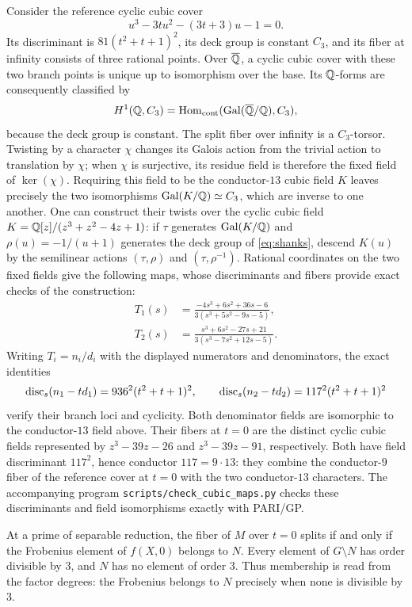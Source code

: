 Consider the reference cyclic cubic cover
\begin{equation}\label{eq:shanks}
 u^3-3tu^2-(3t+3)u-1=0.
\end{equation}
Its discriminant is $81(t^2+t+1)^2$, its deck group is constant $C_3$,
and its fiber at infinity consists of three rational points. Over
$\overline{\mathbb{Q}}$, a cyclic cubic cover with these two branch points is
unique up to isomorphism over the base. Its $\mathbb{Q}$-forms are consequently
classified by
\[
 H^1(\mathbb{Q},C_3)=\operatorname{Hom}_{\mathrm{cont}}
 (\operatorname{Gal}(\overline{\mathbb{Q}}/\mathbb{Q}),C_3),
\]
because the deck group is constant.  The split fiber over infinity is a
$C_3$-torsor.  Twisting by a character $\chi$ changes its Galois action
from the trivial action to translation by $\chi$; when $\chi$ is
surjective, its residue field is therefore the fixed field of
$\ker(\chi)$.  Requiring this field to be the conductor-$13$ cubic field
$K$ leaves precisely the two isomorphisms
$\operatorname{Gal}(K/\mathbb{Q})\simeq C_3$, which are inverse to one another.  One can
construct their twists over
the cyclic cubic field $K=\mathbb{Q}[z]/(z^3+z^2-4z+1)$: if $\tau$ generates
$\operatorname{Gal}(K/\mathbb{Q})$ and $\rho(u)=-1/(u+1)$ generates the deck group of
\eqref{eq:shanks}, descend $K(u)$ by the semilinear actions
$(\tau,\rho)$ and $(\tau,\rho^{-1})$. Rational coordinates on the two
fixed fields give the following maps, whose discriminants and fibers
provide exact checks of the construction:
\begin{align}
 T_1(s)&=\frac{-4s^3+6s^2+36s-6}{3(s^3+5s^2-9s-5)},\label{eq:T1}\\
 T_2(s)&=\frac{s^3+6s^2-27s+21}{3(s^3-7s^2+12s-5)}.\label{eq:T2}
\end{align}
Writing $T_i=n_i/d_i$ with the displayed numerators and denominators,
the exact identities
\[
 \operatorname{disc}_s(n_1-td_1)=936^2(t^2+t+1)^2,\qquad
 \operatorname{disc}_s(n_2-td_2)=117^2(t^2+t+1)^2
\]
verify their branch loci and cyclicity. Both denominator fields are
isomorphic to the conductor-$13$ field above. Their fibers at $t=0$
are the distinct cyclic cubic fields represented by $z^3-39z-26$ and
$z^3-39z-91$, respectively. Both have field discriminant $117^2$, hence
conductor $117=9\cdot13$: they combine the conductor-$9$ fiber of the
reference cover at $t=0$ with the two conductor-$13$ characters.
The accompanying program
\texttt{scripts/check\_cubic\_maps.py} checks these discriminants and
field isomorphisms exactly with PARI/GP.

At a prime of separable reduction, the fiber of $M$ over $t=0$ splits
if and only if the Frobenius element of $f(X,0)$ belongs to $N$.
Every element of $G\setminus N$ has order divisible by $3$, and $N$ has
no element of order $3$. Thus membership is read from the factor degrees:
the Frobenius belongs to $N$ precisely when none is divisible by $3$.

